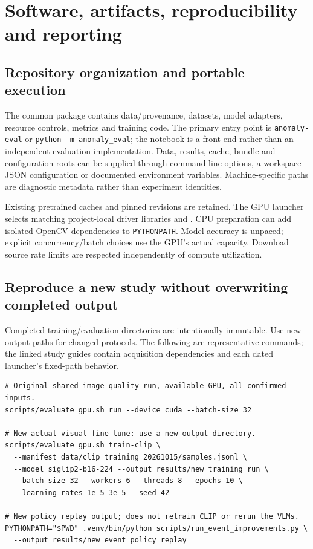 \chapter{Software, artifacts, reproducibility and reporting}
\label{ch:reproduction}
\section{Repository organization and portable execution}
The common package  contains data/provenance, datasets, model adapters, resource controls, metrics and training code. The primary entry point is \texttt{anomaly-eval} or \texttt{python -m anomaly\_eval}; the notebook is a front end rather than an independent evaluation implementation. Data, results, cache, bundle and configuration roots can be supplied through command-line options, a workspace JSON configuration or documented environment variables. Machine-specific paths are diagnostic metadata rather than experiment identities.

Existing pretrained caches and pinned revisions are retained. The GPU launcher selects matching project-local driver libraries and . CPU preparation can add isolated OpenCV dependencies to \texttt{PYTHONPATH}. Model accuracy is unpaced; explicit concurrency/batch choices use the GPU's actual capacity. Download source rate limits are respected independently of compute utilization.

\section{Reproduce a new study without overwriting completed output}
Completed training/evaluation directories are intentionally immutable. Use new output paths for changed protocols. The following are representative commands; the linked study guides contain acquisition dependencies and each dated launcher's fixed-path behavior.
\begin{lstlisting}
# Original shared image quality run, available GPU, all confirmed inputs.
scripts/evaluate_gpu.sh run --device cuda --batch-size 32

# New actual visual fine-tune: use a new output directory.
scripts/evaluate_gpu.sh train-clip \
  --manifest data/clip_training_20261015/samples.jsonl \
  --model siglip2-b16-224 --output results/new_training_run \
  --batch-size 32 --workers 6 --threads 8 --epochs 10 \
  --learning-rates 1e-5 3e-5 --seed 42

# New policy replay output; does not retrain CLIP or rerun the VLMs.
PYTHONPATH="$PWD" .venv/bin/python scripts/run_event_improvements.py \
  --output results/new_event_policy_replay
\end{lstlisting}


